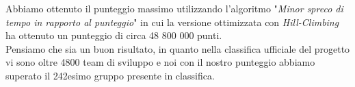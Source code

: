 \documentclass[11pt,a4paper]{article}
\begin{document}
Abbiamo ottenuto il punteggio massimo utilizzando l'algoritmo "\textit{Minor spreco di tempo in rapporto al punteggio}" in cui la versione ottimizzata con \textit{Hill-Climbing} ha ottenuto un punteggio di circa 48 800 000 punti.
\\Pensiamo che sia un buon risultato, in quanto nella classifica ufficiale del progetto vi sono oltre 4800 team di sviluppo e noi con il nostro punteggio abbiamo superato il 242esimo gruppo presente in classifica.
\end{document}
